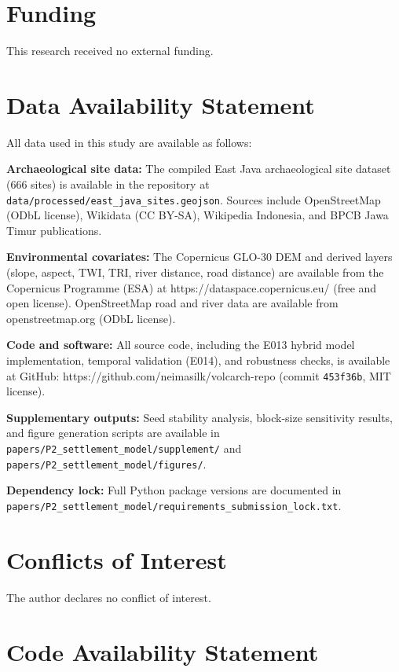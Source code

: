 \documentclass[12pt]{article}
\begin{document}
\section*{Funding}

This research received no external funding.

\section*{Data Availability Statement}

All data used in this study are available as follows:

\textbf{Archaeological site data:} The compiled East Java archaeological site dataset (666 sites) is available in the repository at \texttt{data/processed/east_java_sites.geojson}. Sources include OpenStreetMap (ODbL license), Wikidata (CC BY-SA), Wikipedia Indonesia, and BPCB Jawa Timur publications.

\textbf{Environmental covariates:} The Copernicus GLO-30 DEM and derived layers (slope, aspect, TWI, TRI, river distance, road distance) are available from the Copernicus Programme (ESA) at https://dataspace.copernicus.eu/ (free and open license). OpenStreetMap road and river data are available from openstreetmap.org (ODbL license).

\textbf{Code and software:} All source code, including the E013 hybrid model implementation, temporal validation (E014), and robustness checks, is available at GitHub: https://github.com/neimasilk/volcarch-repo (commit \texttt{453f36b}, MIT license).

\textbf{Supplementary outputs:} Seed stability analysis, block-size sensitivity results, and figure generation scripts are available in \texttt{papers/P2\_settlement\_model/supplement/} and \texttt{papers/P2\_settlement\_model/figures/}.

\textbf{Dependency lock:} Full Python package versions are documented in \texttt{papers/P2\_settlement\_model/requirements\_submission\_lock.txt}.

\section*{Conflicts of Interest}

The author declares no conflict of interest.

\section*{Code Availability Statement}
\end{document}
